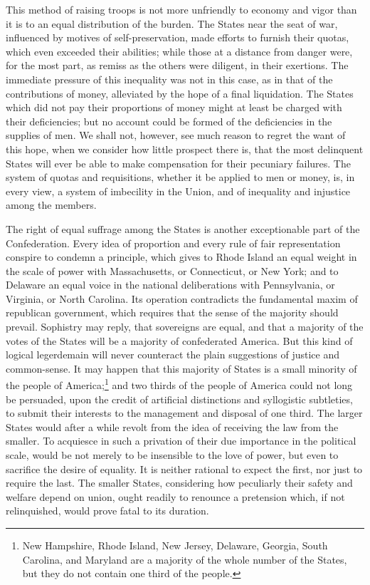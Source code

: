 This method of raising troops is not more unfriendly to economy and vigor than it is to an equal distribution of the burden. The States near the seat of war, influenced by motives of self-preservation, made efforts to furnish their quotas, which even exceeded their abilities; while those at a distance from danger were, for the most part, as remiss as the others were diligent, in their exertions. The immediate pressure of this inequality was not in this case, as in that of the contributions of money, alleviated by the hope of a final liquidation. The States which did not pay their proportions of money might at least be charged with their deficiencies; but no account could be formed of the deficiencies in the supplies of men. We shall not, however, see much reason to regret the want of this hope, when we consider how little prospect there is, that the most delinquent States will ever be able to make compensation for their pecuniary failures. The system of quotas and requisitions, whether it be applied to men or money, is, in every view, a system of imbecility in the Union, and of inequality and injustice among the members.

The right of equal suffrage among the States is another exceptionable part of the Confederation. Every idea of proportion and every rule of fair representation conspire to condemn a principle, which gives to Rhode Island an equal weight in the scale of power with Massachusetts, or Connecticut, or New York; and to Delaware an equal voice in the national deliberations with Pennsylvania, or Virginia, or North Carolina. Its operation contradicts the fundamental maxim of republican government, which requires that the sense of the majority should prevail. Sophistry may reply, that sovereigns are equal, and that a majority of the votes of the States will be a majority of confederated America. But this kind of logical legerdemain will never counteract the plain suggestions of justice and common-sense. It may happen that this majority of States is a small minority of the people of America;\footnote{New Hampshire, Rhode Island, New Jersey, Delaware, Georgia, South Carolina, and Maryland are a majority of the whole number of the States, but they do not contain one third of the people.} and two thirds of the people of America could not long be persuaded, upon the credit of artificial distinctions and syllogistic subtleties, to submit their interests to the management and disposal of one third. The larger States would after a while revolt from the idea of receiving the law from the smaller. To acquiesce in such a privation of their due importance in the political scale, would be not merely to be insensible to the love of power, but even to sacrifice the desire of equality. It is neither rational to expect the first, nor just to require the last. The smaller States, considering how peculiarly their safety and welfare depend on union, ought readily to renounce a pretension which, if not relinquished, would prove fatal to its duration.

